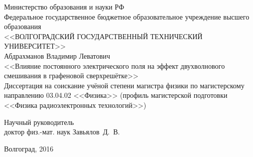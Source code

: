 \begin{titlepage}
\begin{center}
    Министерство образования и науки РФ\\
    Федеральное государственное бюджетное образовательное учреждение высшего образования\\
    <<ВОЛГОГРАДСКИЙ ГОСУДАРСТВЕННЫЙ ТЕХНИЧЕСКИЙ УНИВЕРСИТЕТ>>\\
    \vspace{3cm}
    Абдрахманов Владимир Леватович\\
    \vspace{1cm}
    <<Влияние постоянного электрического поля на эффект двухволнового смешивания в графеновой сверхрешётке>>\\
    \vspace{3cm}
    Диссертация на соискание учёной степени магистра физики по магистерскому направлению 03.04.02 <<Физика>> (профиль магистерской подготовки <<Физика радиоэлектронных технологий>>)\\
    \vspace{3cm}
    \begin{flushright}
        \begin{minipage}{0.6\textwidth}
            \begin{center}
                Научный руководитель\\
                доктор физ.-мат. наук Завьялов~Д.~В.
            \end{center}
        \end{minipage}
    \end{flushright}
    \vfill
    Волгоград, 2016
\end{center}
\newpage
\thispagestyle{empty}



\end{titlepage}
